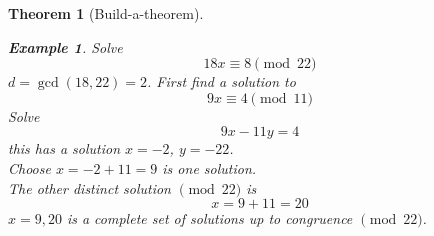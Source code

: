 \documentclass[letterpaper]{article}
\newtheorem{theorem}{Theorem}[section]
\newtheorem{example}{Example}[theorem]
\begin{document}
\begin{theorem} [Build-a-theorem]
        \begin{example}
            Solve \[ 18x\equiv 8\pmod{22} \]
            $d=\gcd(18,22)=2$. First find a solution to
            \[ 9x\equiv 4\pmod{11} \]
            Solve 
            \[ 9x-11y = 4\]
            this has a solution $x=-2$, $y=-22$. \\
            Choose $x=-2+11 = 9$ is one solution. \\
            The other distinct solution $\pmod{22}$ is 
            \[ x=9+11=20 \] 
            $x=9,20$ is a complete set of solutions up to congruence $\pmod{22}$.

        \end{example}

    \end{theorem}
\end{document}
